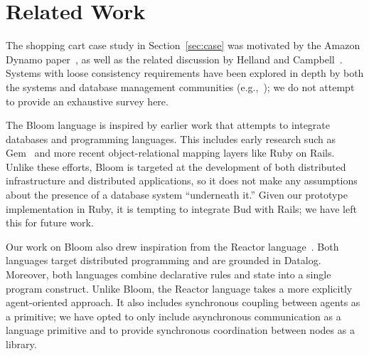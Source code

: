 \section{Related Work}
\label{sec:relwork}
The shopping cart case study in Section~\ref{sec:case} was motivated by the
Amazon Dynamo paper~\cite{dynamo}, as well as the related discussion by Helland
and Campbell~\cite{quicksand}. Systems with loose consistency requirements have
been explored in depth by both the systems and database management communities
(e.g.,~\cite{sagas,leases,gray1996dangers,bayou}); we do not attempt to provide
an exhaustive survey here.

The Bloom language is inspired by earlier work that attempts to integrate
databases and programming languages.  This includes early research such as
Gem~\cite{gem} and more recent object-relational mapping layers like Ruby on
Rails.  Unlike these efforts, Bloom is targeted at the development of both
distributed infrastructure and distributed applications, so it does not make any
assumptions about the presence of a database system ``underneath it.''  Given
our prototype implementation in Ruby, it is tempting to integrate Bud with
Rails; we have left this for future work.

Our work on Bloom also drew inspiration from the Reactor
language~\cite{reactors}. Both languages target distributed programming and are
grounded in Datalog. Moreover, both languages combine declarative rules and
state into a single program construct. Unlike Bloom, the Reactor language takes
a more explicitly agent-oriented approach. It also includes synchronous coupling
between agents as a primitive; we have opted to only include asynchronous
communication as a language primitive and to provide synchronous coordination
between nodes as a library.

